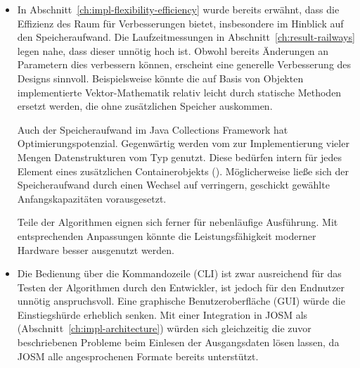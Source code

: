 \documentclass[../main/thesis.tex]{subfiles}
\begin{document}
\begin{itemize}
\item
In Abschnitt~\ref{ch:impl-flexibility-efficiency} wurde bereits erwähnt, dass die Effizienz des  Raum für Verbesserungen bietet, insbesondere im Hinblick auf den Speicheraufwand.
Die Laufzeitmessungen in Abschnitt~\ref{ch:result-railways} legen nahe, dass dieser unnötig hoch ist.
Obwohl bereits Änderungen an Parametern dies verbessern können, erscheint eine generelle Verbesserung des Designs sinnvoll.
Beispielsweise könnte die auf Basis von Objekten implementierte Vektor-Mathematik relativ leicht durch statische Methoden ersetzt werden, die ohne zusätzlichen Speicher auskommen.

Auch der Speicheraufwand im Java Collections Framework hat Optimierungspotenzial.
Gegenwärtig werden vom  zur Implementierung vieler Mengen Datenstrukturen vom Typ  genutzt.
Diese bedürfen intern für jedes Element eines zusätzlichen Containerobjekts ().
Möglicherweise ließe sich der Speicheraufwand durch einen Wechsel auf  verringern, geschickt gewählte Anfangskapazitäten vorausgesetzt.

Teile der Algorithmen eignen sich ferner für nebenläufige Ausführung.
Mit entsprechenden Anpassungen könnte die Leistungsfähigkeit moderner Hardware besser ausgenutzt werden.

\item
Die Bedienung über die Kommandozeile (CLI) ist zwar ausreichend für das Testen der Algorithmen durch den Entwickler, ist jedoch für den Endnutzer unnötig anspruchsvoll.
Eine graphische Benutzeroberfläche (GUI) würde die Einstiegshürde erheblich senken.
Mit einer Integration in JOSM als  (Abschnitt~\ref{ch:impl-architecture}) würden sich gleichzeitig die zuvor beschriebenen Probleme beim Einlesen der Ausgangsdaten lösen lassen, da JOSM alle angesprochenen Formate bereits unterstützt.

\end{itemize}
\end{document}
